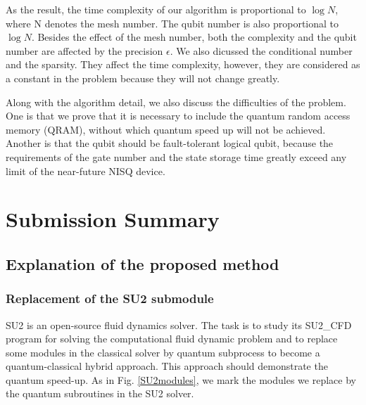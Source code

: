 \documentclass[%
 reprint,
 amsmath,amssymb,
pra,
]{revtex4-1}
\begin{document}
As the result, the time complexity of our algorithm is proportional to $\log⁡ N$, where N denotes the mesh number. The qubit number is also proportional to $\log⁡ N$. Besides the effect of the mesh number, both the complexity and the qubit number are affected by the precision $\epsilon$. We also dicussed the conditional number and the sparsity. They affect the time complexity, however, they are considered as a constant in the problem because they will not change greatly.

Along with the algorithm detail, we also discuss the difficulties of the problem. One is that we prove that it is necessary to include the quantum random access memory (QRAM), without which quantum speed up will not be achieved. Another is that the qubit should be fault-tolerant logical qubit, because the requirements of the gate number and the state storage time greatly exceed any limit of the near-future NISQ device.

\section{Submission Summary}

\subsection{Explanation of the proposed method}

\subsubsection{Replacement of the SU2 submodule}

SU2 is an open-source fluid dynamics solver. The task is to study its SU2\_CFD program for solving the computational fluid dynamic problem and to replace some modules in the classical solver by quantum subprocess to become a quantum-classical hybrid approach. This approach should demonstrate the quantum speed-up. As in Fig. \ref{SU2modules}, we mark the modules we replace by the quantum subroutines in the SU2 solver.
\end{document}
